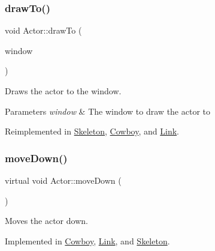 \subsubsection{\texorpdfstring{drawTo()}{drawTo()}}
{\footnotesize\ttfamily void Actor\+::draw\+To (\begin{DoxyParamCaption}\item[{sf\+::\+Render\+Window \&}]{window }\end{DoxyParamCaption})\hspace{0.3cm}{\ttfamily [virtual]}}



Draws the actor to the window. 


\begin{DoxyParams}{Parameters}
{\em window} & The window to draw the actor to \\
\hline
\end{DoxyParams}


Reimplemented in \mbox{\hyperlink{classSkeleton_aa39ac09590a5274536dc2fc125cc62e6}{Skeleton}}, \mbox{\hyperlink{classCowboy_af7e8a3e9cdcd9054b63a3661ca3f69a6}{Cowboy}}, and \mbox{\hyperlink{classLink_ac91a924fdf779fa02d477b7f60dbdc1e}{Link}}.

\mbox{\label{classActor_ad2737cd62ea0c96f75853afb5d1fd83a}} 
\subsubsection{\texorpdfstring{moveDown()}{moveDown()}}
{\footnotesize\ttfamily virtual void Actor\+::move\+Down (\begin{DoxyParamCaption}{ }\end{DoxyParamCaption})\hspace{0.3cm}{\ttfamily [pure virtual]}}



Moves the actor down. 



Implemented in \mbox{\hyperlink{classCowboy_a25b9c66203a4a5e762984ca0bed511e0}{Cowboy}}, \mbox{\hyperlink{classLink_a9ff8ec271a0119f6e1ee178afb47f323}{Link}}, and \mbox{\hyperlink{classSkeleton_aee2055fa3d1db80392b365aa40c878bf}{Skeleton}}.

\mbox{\label{classActor_a522d6069bacaa9985db7a234bde2c8b6}} 
